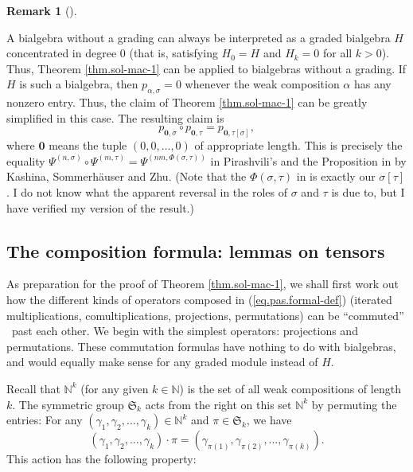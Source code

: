 \documentclass[numbers=enddot,12pt,final,onecolumn,notitlepage]{scrartcl}%
\theoremstyle{definition}
\newtheorem{remk}[theo]{Remark}
\newenvironment{remark}[1][]
{\begin{remk}[#1]\begin{leftbar}}
{\end{leftbar}\end{remk}}
\begin{document}
\begin{remark}
A bialgebra without a grading can always be interpreted as a graded bialgebra
$H$ concentrated in degree $0$ (that is, satisfying $H_{0}=H$ and $H_{k}=0$
for all $k>0$). Thus, Theorem \ref{thm.sol-mac-1} can be applied to bialgebras
without a grading. If $H$ is such a bialgebra, then $p_{\alpha,\sigma}=0$
whenever the weak composition $\alpha$ has any nonzero entry. Thus, the claim
of Theorem \ref{thm.sol-mac-1} can be greatly simplified in this case. The
resulting claim is%
\[
p_{\mathbf{0},\sigma}\circ p_{\mathbf{0},\tau}=p_{\mathbf{0},\tau\left[
\sigma\right]  },
\]
where $\mathbf{0}$ means the tuple $\left(  0,0,\ldots,0\right)  $ of
appropriate length. This is precisely the equality $\Psi^{\left(
n,\sigma\right)  }\circ\Psi^{\left(  m,\tau\right)  }=\Psi^{\left(
nm,\Phi\left(  \sigma,\tau\right)  \right)  }$ in Pirashvili's \cite[\S 1]%
{Pirash02} and the Proposition in \cite[\S 1.3]{KaSoZh06} by Kashina,
Sommerh\"{a}user and Zhu. (Note that the $\Phi\left(  \sigma,\tau\right)  $ in
\cite[Proposition 5.3]{Pirash02} is exactly our $\sigma\left[  \tau\right]  $.
I do not know what the apparent reversal in the roles of $\sigma$ and $\tau$
is due to, but I have verified my version of the result.)
\end{remark}

\subsection{The composition formula: lemmas on tensors}

As preparation for the proof of Theorem \ref{thm.sol-mac-1}, we shall first
work out how the different kinds of operators composed in
(\ref{eq.pas.formal-def}) (iterated multiplications, comultiplications,
projections, permutations) can be \textquotedblleft commuted\textquotedblright%
\ past each other. We begin with the simplest operators: projections and
permutations. These commutation formulas have nothing to do with bialgebras,
and would equally make sense for any graded module instead of $H$.

Recall that $\mathbb{N}^{k}$ (for any given $k\in\mathbb{N}$) is the set of
all weak compositions of length $k$. The symmetric group $\mathfrak{S}_{k}$
acts from the right on this set $\mathbb{N}^{k}$ by permuting the entries: For
any $\left(  \gamma_{1},\gamma_{2},\ldots,\gamma_{k}\right)  \in\mathbb{N}%
^{k}$ and $\pi\in\mathfrak{S}_{k}$, we have%
\begin{equation}
\left(  \gamma_{1},\gamma_{2},\ldots,\gamma_{k}\right)  \cdot\pi=\left(
\gamma_{\pi\left(  1\right)  },\gamma_{\pi\left(  2\right)  },\ldots
,\gamma_{\pi\left(  k\right)  }\right)  . \label{eq.gammapi}%
\end{equation}
This action has the following property:
\end{document}

